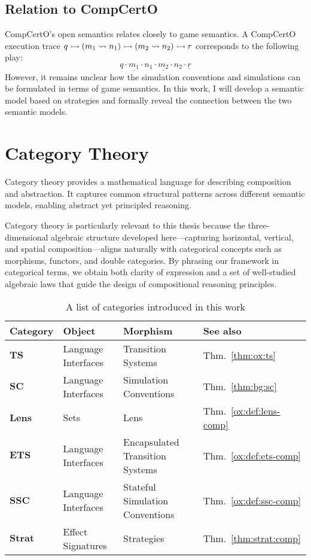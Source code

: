 \subsection{Relation to CompCertO}

CompCertO's open semantics relates closely to game semantics\citep{compcerto21tr}.
A CompCertO execution trace
$q \rightarrowtail (m_1 \leadsto n_1) \rightarrowtail (m_2 \leadsto n_2) \rightarrowtail r$
corresponds to the following play:
\[
  q
  \cdot
  \underline{m_1} \cdot n_1 \cdot \underline{m_2} \cdot n_2
  \cdot
  \underline{r}
\]
However,
it remains unclear
how the simulation conventions and simulations
can be formulated in terms of game semantics.
In this work,
I will develop a semantic model
based on strategies
and formally reveal the connection
between the two semantic models.

\section{Category Theory}

Category theory provides
a mathematical language for describing
composition and abstraction.
It captures common structural patterns
across different semantic models,
enabling abstract yet principled reasoning.

Category theory is particularly relevant to this thesis
because the three-dimensional algebraic structure
developed here—capturing horizontal, vertical, and spatial composition—aligns naturally with categorical concepts
such as morphisms, functors, and double categories.
By phrasing our framework in categorical terms,
we obtain both clarity of expression
and a set of well-studied algebraic laws
that guide the design of compositional reasoning principles.

\begin{table}
  \centering
  \begin{tabular}{llll}
    \toprule
    Category & Object & Morphism & See also\\
    \midrule
    $\mathbf{TS}$ & Language Interfaces & Transition Systems & Thm.~\ref{thm:ox:ts}\\
    $\mathbf{SC}$ & Language Interfaces & Simulation Conventions & Thm.~\ref{thm:bg:sc}\\
    $\mathbf{Lens}$ & Sets & Lens & Thm.~\ref{ox:def:lens-comp}\\
    $\mathbf{ETS}$ & Language Interfaces & Encapsulated Transition Systems & Thm.~\ref{ox:def:ets-comp}\\
    $\mathbf{SSC}$ & Language Interfaces & Stateful Simulation Conventions & Thm.~\ref{ox:def:ssc-comp}\\
    $\mathbf{Strat}$ & Effect Signatures & Strategies & Thm.~\ref{thm:strat:comp}\\
    \bottomrule
  \end{tabular}
  \caption{A list of categories introduced in this work}
  \label{bg:tab:cat}
\end{table}

